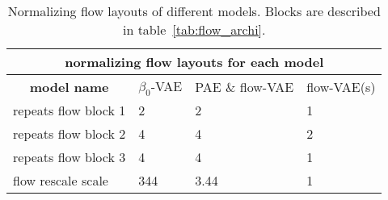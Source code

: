 \documentclass[10pt]{article} \usepackage[accepted]{tmlr}
\begin{document}
\begin{table}[h]
\begin{center}
\begin{tabular}{llll}
\multicolumn{4}{c}{\textbf{normalizing flow layouts for each model}}           \\ \hline
\multicolumn{1}{c|}{\textbf{model name}}   & \multicolumn{1}{c|}{$\beta_0$-VAE} & \multicolumn{1}{c|}{PAE \& flow-VAE}                   & \multicolumn{1}{c}{flow-VAE(s)} \\ \hline
\multicolumn{1}{l|}{repeats flow block 1}  & \multicolumn{1}{l|}{2}                    & \multicolumn{1}{l|}{2}                     & 1                                  \\
\multicolumn{1}{l|}{repeats flow block 2}  & \multicolumn{1}{l|}{4}                    & \multicolumn{1}{l|}{4}                     & 2                                  \\
\multicolumn{1}{l|}{repeats flow block 3}  & \multicolumn{1}{l|}{4}                    & \multicolumn{1}{l|}{4}                     & 1                                  \\
\multicolumn{1}{l|}{flow rescale scale}    & \multicolumn{1}{l|}{344}                 & \multicolumn{1}{l|}{3.44}                  & 1                                  \\
\end{tabular}
\caption{\label{tab:flows} Normalizing flow layouts of different models. Blocks are described in table~\ref{tab:flow_archi}.}
\end{center}
\end{table}
\end{document}
